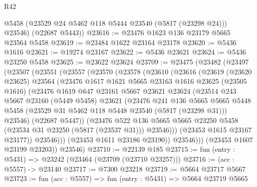 \begin{lexlean}{R42}
\begin{coremodule}
        @5458
        (@23529 @24 @5462 @118 @5444 @23540 (@5817 (@23298 @24)))
        @23546)
      (@22687 @5443))
@23616 := @23476 @1623 @136 @23179 @5665 @23564 @5458
@23619 := @23484 @1622 @23164 @23178
@23620 := @5436 @1616
@23621 := @19274 @23167
@23622 := @5436 @23621
@23624 := @5436 @23250 @5458
@23625 := @23622 @23624
@23709 := @23475
    (@23482
      (@23497
        (@23507
          (@23551
            (@23557
              (@23570
                (@23578
                  (@23610
                    (@23616
                      (@23619
                        (@23620 @23625)
                        @23564
                        (@23476
                          @1617
                          @1621
                          @5665
                          @23163
                          @1616
                          @23625
                          (@23505 @1616)
                          (@23476
                            @1619
                            @647
                            @23161
                            @5667
                            @23621
                            @23624
                            (@23514
                              @243
                              @5667
                              @23160
                              (@5449 @5458)
                              @23621
                              (@23476
                                @241
                                @136
                                @5665
                                @5665
                                @5448
                                @5458
                                (@23529 @31 @5462 @118 @5448 @23540 (@5817 (@23298 @31)))
                                @23546)
                              (@22687 @5447))
                            (@23476
                              @522
                              @136
                              @5665
                              @5665
                              @23250
                              @5458
                              (@23534 @31 @23250 (@5817 (@23537 @31)))
                              @23546)))
                        (@23453 @1615 @23167 @23177))
                      @23546)))
                (@23453 @1611 @23186 @23190))
              @23546)))
        (@23453 @1607 @23199 @23203))
      @23546)
@23710 := @22139 @185
@23715 := fun (entry : @5431) => @23242 (@23464 (@23709 (@23710 @23257)))
@23716 := (acc : @5557) -> @23140
@23717 := @7300 @23218
@23719 := @5664 @23717 @5667
@23723 := fun (acc : @5557) => fun (entry : @5431) => @5664 @23719 @5665

\end{coremodule}
\end{lexlean}
